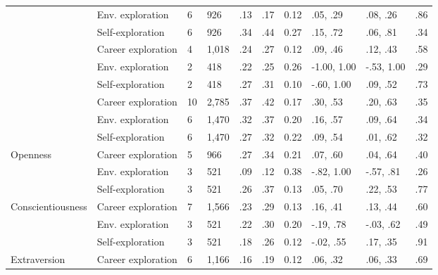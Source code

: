 \begin{table}[ht]
\begin{tabular}{llllllllll}
   & \hspace{0.8em}Env. exploration & 6 & 926 & .13 & .17 & 0.12 & .05, .29 & .08, .26 & .86 \\ 
   & \hspace{0.8em}Self-exploration & 6 & 926 & .34 & .44 & 0.27 & .15, .72 & .06, .81 & .34 \\ 
   & Career exploration & 4 & 1,018 & .24 & .27 & 0.12 & .09, .46 & .12, .43 & .58 \\ 
   & \hspace{0.8em}Env. exploration & 2 & 418 & .22 & .25 & 0.26 & -1.00, 1.00 & -.53, 1.00 & .29 \\ 
   & \hspace{0.8em}Self-exploration & 2 & 418 & .27 & .31 & 0.10 & -.60, 1.00 & .09, .52 & .73 \\ 
   & Career exploration & 10 & 2,785 & .37 & .42 & 0.17 & .30, .53 & .20, .63 & .35 \\ 
   & \hspace{0.8em}Env. exploration & 6 & 1,470 & .32 & .37 & 0.20 & .16, .57 & .09, .64 & .34 \\ 
   & \hspace{0.8em}Self-exploration & 6 & 1,470 & .27 & .32 & 0.22 & .09, .54 & .01, .62 & .32 \\ 
  Openness & Career exploration & 5 & 966 & .27 & .34 & 0.21 & .07, .60 & .04, .64 & .40 \\ 
   & \hspace{0.8em}Env. exploration & 3 & 521 & .09 & .12 & 0.38 & -.82, 1.00 & -.57, .81 & .26 \\ 
   & \hspace{0.8em}Self-exploration & 3 & 521 & .26 & .37 & 0.13 & .05, .70 & .22, .53 & .77 \\ 
  Conscientiousness & Career exploration & 7 & 1,566 & .23 & .29 & 0.13 & .16, .41 & .13, .44 & .60 \\ 
   & \hspace{0.8em}Env. exploration & 3 & 521 & .22 & .30 & 0.20 & -.19, .78 & -.03, .62 & .49 \\ 
   & \hspace{0.8em}Self-exploration & 3 & 521 & .18 & .26 & 0.12 & -.02, .55 & .17, .35 & .91 \\ 
  Extraversion & Career exploration & 6 & 1,166 & .16 & .19 & 0.12 & .06, .32 & .06, .33 & .69 \\ 

\end{tabular}
\end{table}
